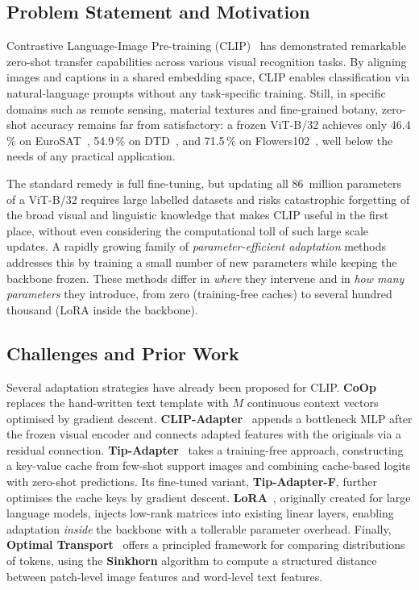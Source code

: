 \documentclass[10pt,twocolumn,letterpaper]{article}
\begin{document}
\subsection{Problem Statement and Motivation}

Contrastive Language-Image Pre-training (CLIP)~\cite{radford2021learning} has demonstrated remarkable zero-shot transfer capabilities across various visual recognition tasks.  By aligning images and captions in a shared embedding space, CLIP enables classification via natural-language prompts without any task-specific training. Still, in specific domains
such as remote sensing, material textures and fine-grained botany, zero-shot accuracy remains far from satisfactory: a frozen ViT-B/32 achieves only 46.4\,\% on EuroSAT~\cite{helber2019eurosat}, 54.9\,\% on DTD~\cite{cimpoi2014describing}, and 71.5\,\% on Flowers102~\cite{nilsback2008automated}, well below the needs of any practical application.

The standard remedy is full fine-tuning, but updating all 86~million parameters of a ViT-B/32 requires large labelled datasets and risks catastrophic forgetting of the broad visual and linguistic knowledge that makes CLIP useful in the first place, without even considering the computational toll of such large scale updates. A rapidly growing family of 
\emph{parameter-efficient adaptation} methods addresses this by training a small number of new parameters while keeping the backbone frozen. These methods differ in \emph{where} they intervene and in \emph{how many parameters} they introduce, from zero (training-free caches) to several hundred thousand (LoRA inside the backbone).


\subsection{Challenges and Prior Work}

Several adaptation strategies have already been proposed for CLIP. \textbf{CoOp}~\cite{zhou2022learning} replaces the hand-written text template with $M$ continuous context vectors optimised by gradient descent.
\textbf{CLIP-Adapter}~\cite{gao2024clipadapter} appends a bottleneck MLP after the frozen visual encoder and connects adapted features with the originals via a residual connection.
\textbf{Tip-Adapter}~\cite{zhang2022tip} takes a training-free approach, constructing a key-value cache from few-shot support images and combining cache-based logits with zero-shot predictions. Its fine-tuned variant, \textbf{Tip-Adapter-F}, further optimises the cache keys by gradient descent.
\textbf{LoRA}~\cite{hu2022lora}, originally created for large language models, injects low-rank matrices into existing linear layers, enabling adaptation \emph{inside} the backbone with a tollerable parameter overhead.
Finally, \textbf{Optimal Transport}~\cite{cuturi2013sinkhorn} offers a principled framework for comparing distributions of tokens, using the \textbf{Sinkhorn} algorithm to compute a structured distance between patch-level image features and word-level text features.
\end{document}
